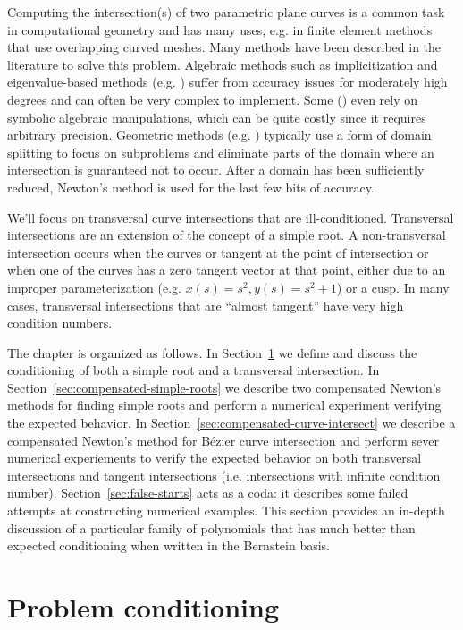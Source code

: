 Computing the intersection(s) of two parametric plane curves is a
common task in computational geometry and has many uses, e.g. in
finite element methods that use overlapping curved meshes. Many
methods have been described in the literature to solve this problem.
Algebraic methods such as implicitization and eigenvalue-based
methods (e.g. \cite{Manocha:CSD-92-698}) suffer
from accuracy issues for moderately high degrees and can often be
very complex to implement. Some (\cite{Bates2008}) even rely on symbolic
algebraic manipulations, which can be quite costly since it requires
arbitrary precision.
Geometric methods (e.g. \cite{Sederberg1986, Sederberg1990, Kim1998})
typically use a form of domain splitting to focus on subproblems and
eliminate parts of the domain where an intersection is guaranteed not
to occur. After a domain has been sufficiently reduced, Newton's method
is used for the last few bits of accuracy.

We'll focus on transversal curve intersections that are ill-conditioned.
Transversal intersections are an extension of the concept of a
simple root. A non-transversal intersection occurs when the curves
or tangent at the point of intersection or when one of the curves
has a zero tangent vector at that point, either due to an improper
parameterization (e.g. \(x(s) = s^2, y(s) = s^2 + 1\)) or a cusp.
In many cases, transversal intersections that are ``almost tangent'' have
very high condition numbers.

The chapter is organized as follows. In Section~\ref{sec:conditioning}
we define and discuss the conditioning of both a simple root and
a transversal intersection. In Section~\ref{sec:compensated-simple-roots}
we describe two compensated Newton's methods for finding simple roots
and perform a numerical experiment verifying the expected behavior.
In Section~\ref{sec:compensated-curve-intersect} we describe a
compensated Newton's method for B\'{e}zier curve intersection and
perform sever numerical experiements to verify the expected behavior
on both transversal intersections and tangent intersections (i.e.
intersections with infinite condition number).
Section~\ref{sec:false-starts} acts as a
coda: it describes some failed attempts at constructing numerical
examples. This section provides an in-depth discussion of a particular
family of polynomials that has much better than expected conditioning
when written in the Bernstein basis.

\section{Problem conditioning}\label{sec:conditioning}

